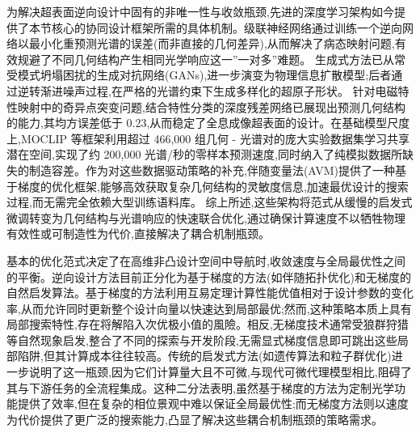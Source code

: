 为解决超表面逆向设计中固有的非唯一性与收敛瓶颈,先进的深度学习架构如今提供了本节核心的协同设计框架所需的具体机制。级联神经网络通过训练一个逆向网络以最小化重预测光谱的误差(而非直接的几何差异),从而解决了病态映射问题,有效规避了不同几何结构产生相同光学响应这一''一对多''难题。\citep{doi_10_1063_5_0171437_92a49ec0} \citep{doi_10_1515_nanoph_2021_0434_1357d09e} 生成式方法已从常受模式坍塌困扰的生成对抗网络(GANs),进一步演变为物理信息扩散模型;后者通过逆转渐进噪声过程,在严格的光谱约束下生成多样化的超原子形状。\citep{doi_10_71465_fapm546_bda368a5} 针对电磁特性映射中的奇异点突变问题,结合特性分类的深度残差网络已展现出预测几何结构的能力,其均方误差低于 0.23,从而稳定了全息成像超表面的设计。在基础模型尺度上,MOCLIP 等框架利用超过 466,000 组几何 - 光谱对的庞大实验数据集学习共享潜在空间,实现了约 200,000 光谱/秒的零样本预测速度,同时纳入了纯模拟数据所缺失的制造容差。作为对这些数据驱动策略的补充,伴随变量法(AVM)提供了一种基于梯度的优化框架,能够高效获取复杂几何结构的灵敏度信息,加速最优设计的搜索过程,而无需完全依赖大型训练语料库。\citep{doi_10_2528_pier12020501_bb5007b1} \citep{doi_10_1109_nemo62710_2025_11215427_067e96bb} 综上所述,这些架构将范式从缓慢的启发式微调转变为几何结构与光谱响应的快速联合优化,通过确保计算速度不以牺牲物理有效性或可制造性为代价,直接解决了耦合机制瓶颈。\citep{doi_10_1038_s41467_026_76714_x_8ca5d39b} \citep{doi_10_71465_fapm546_bda368a5} \citep{doi_10_1109_iccem60619_2024_10559188_c3199408} \citep{doi_10_1109_pn62551_2024_10621761_0bc70b78}

基本的优化范式决定了在高维非凸设计空间中导航时,收敛速度与全局最优性之间的平衡。逆向设计方法目前正分化为基于梯度的方法(如伴随拓扑优化)和无梯度的自然启发算法。基于梯度的方法利用互易定理计算性能优值相对于设计参数的变化率,从而允许同时更新整个设计向量以快速达到局部最优;然而,这种策略本质上具有局部搜索特性,存在将解陷入次优极小值的風險。相反,无梯度技术通常受狼群狩猎等自然现象启发,整合了不同的探索与开发阶段,无需显式梯度信息即可跳出这些局部陷阱,但其计算成本往往较高。传统的启发式方法(如遗传算法和粒子群优化)进一步说明了这一瓶颈,因为它们计算量大且不可微,与现代可微代理模型相比,阻碍了其与下游任务的全流程集成。这种二分法表明,虽然基于梯度的方法为定制光学功能提供了效率,但在复杂的相位景观中难以保证全局最优性;而无梯度方法则以速度为代价提供了更广泛的搜索能力,凸显了解决这些耦合机制瓶颈的策略需求。\citep{s2_2516273dc5b4511c838bf9236a61f71f4e32f6b5_1724698f} \citep{doi_10_1088_1367_2630_acfcd6_32444f17} \citep{s2_76a83ea3baed75ad88b7f0782eb9a694a330c853_cee16cac}

